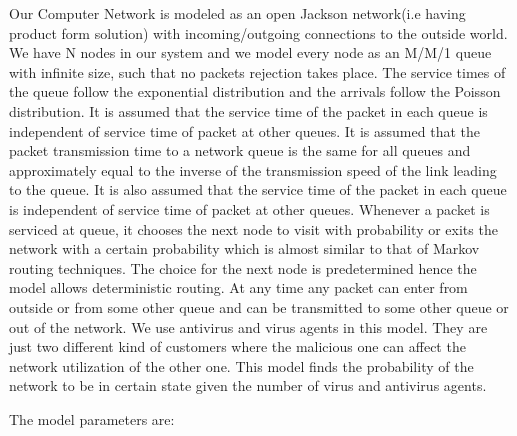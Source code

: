 Our Computer Network is modeled as an open Jackson network(i.e having product form solution) with incoming/outgoing connections to the outside world. We have N nodes in our system and we model every node as an M/M/1 queue with infinite size, such that no packets rejection takes place. The service times of the queue follow the exponential distribution and the arrivals follow the Poisson distribution. It is assumed that the service time of the packet in each queue is independent of service time of packet at other queues. It is assumed that the packet transmission time to a network queue is the same for all queues and approximately equal to the inverse of the transmission speed of the link leading to the queue. It is also assumed that the service time of the packet in each queue is independent of service time of packet at other queues.  Whenever a packet is serviced at queue, it chooses the next node to visit with probability or exits the network with a certain probability which is almost similar to that of Markov routing techniques. The choice for the next node is predetermined hence the model allows deterministic routing. At any time any packet can enter from outside or from some other queue and can be transmitted to some other queue or out of the network. We use antivirus and virus agents in this model. They are just two different kind of customers where the malicious one can affect the network utilization of the other one. This model finds the probability of the network to be in certain state given the number of virus and antivirus agents. 

\hspace{1 cm}The model parameters are:

